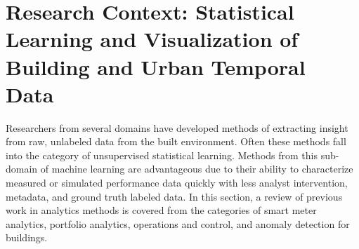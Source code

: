 \section{Research Context: Statistical Learning and Visualization of Building and Urban Temporal Data}
\label{sec:litreview}

Researchers from several domains have developed methods of extracting insight from raw, unlabeled data from the built environment. Often these methods fall into the category of unsupervised statistical learning. Methods from this sub-domain of machine learning are advantageous due to their ability to characterize measured or simulated performance data quickly with less analyst intervention, metadata, and ground truth labeled data. In this section, a review of previous work in analytics methods is covered from the categories of smart meter analytics, portfolio analytics, operations and control, and anomaly detection for buildings. 